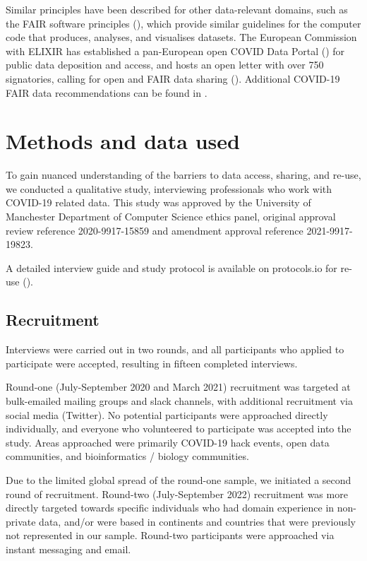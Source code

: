 \documentclass{CUP-JNL-DAP}%
\begin{document}
Similar principles have been described for other data-relevant domains, such as the FAIR software principles (\cite{chue_hong_fair_2021}), which provide similar guidelines for the computer code that produces, analyses, and visualises datasets. The European Commission with ELIXIR has established a pan-European open COVID Data Portal (\cite{elixirCovidPortal}) for public data deposition and access, and hosts an open letter with over 750 signatories, calling for open and FAIR data sharing (\cite{openDataLetter}). Additional COVID-19 FAIR data recommendations can be found in \cite{FAIR_data_for_a_coordinated_COVID-19_response}.

\section{Methods and data used}
To gain nuanced understanding of the barriers to data access, sharing, and re-use, we conducted a qualitative study, interviewing professionals who work with COVID-19 related data. This study was approved by the University of Manchester Department of Computer Science ethics panel, original approval review reference 2020-9917-15859 and amendment approval reference 2021-9917-19823. 

A detailed interview guide and study protocol is available on protocols.io for re-use (\cite{covid_study_protocol}).

\subsection{Recruitment}
Interviews were carried out in two rounds, and all participants who applied to participate were accepted, resulting in fifteen completed interviews. 

Round-one (July-September 2020 and March 2021) recruitment was targeted at bulk-emailed mailing groups and slack channels, with additional recruitment via social media (Twitter). No potential participants were approached directly individually, and everyone who volunteered to participate was accepted into the study. Areas approached were primarily COVID-19 hack events, open data communities, and bioinformatics / biology communities. 

Due to the limited global spread of the round-one sample, we initiated a second round of recruitment. Round-two (July-September 2022) recruitment was more directly targeted towards specific individuals who had domain experience in non-private data, and/or were based in continents and countries that were previously not represented in our sample. Round-two participants were approached via instant messaging and email. 
\end{document}
